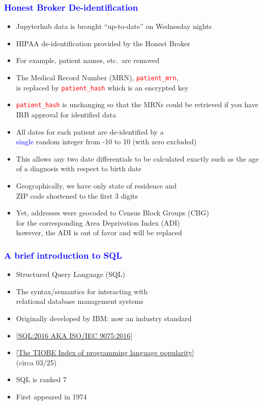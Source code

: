 \documentclass[11pt,pdftex,dvipsnames,usenames]{beamer}
\begin{document}
\begin{frame}[fragile]\frametitle{\bf\textcolor{blue}{Honest Broker De-identification}}

\begin{itemize}
\item Jupyterhub data is brought ``up-to-date'' on Wednesday nights
\item HIPAA de-identification provided by the Honest Broker
\item For example, patient names, etc.\ are removed
\item The Medical Record Number (MRN),
  \textcolor{red}{\texttt{patient\_mrn}},\\ is replaced by 
  \textcolor{red}{\texttt{patient\_hash}} which is an encrypted
  key
\item \textcolor{red}{\texttt{patient\_hash}} is unchanging so that
the MRNs could be retrieved if you have IRB approval for identified
data
\item All dates for each patient are de-identified by a\\
\textcolor{blue}{single} random integer from -10 to 10 (with zero excluded)
\item This allows any two date differentials to be calculated
exactly such as the age of a diagnosis with respect to birth date
\item Geographically, we have only state of residence and\\
ZIP code shortened to the first 3 digits 
\item Yet, addresses were geocoded to Census Block Groups (CBG)\\ 
for the corresponding Area Deprivation Index (ADI)\\
however, the ADI is out of favor and will be replaced
\end{itemize}

\end{frame}


\begin{frame}[fragile]\frametitle{\bf\textcolor{blue}{A brief introduction to SQL}}

\begin{itemize}
\item Structured Query Language (SQL) 
\item The syntax/semantics for interacting with\\
relational database management systems
\item Originally developed by IBM: now an industry standard
\item \textcolor{PineGreen}{[\href{https://www.iso.org/standard/63555.html}
{SQL:2016 AKA ISO/IEC 9075:2016}]}
\item \textcolor{PineGreen}{[\href{https://www.tiobe.com/tiobe-index}
{The TIOBE Index of programming language popularity}]}\\ (circa 03/25)
\item SQL is ranked 7
\item First appeared in 1974
\end{itemize}

\end{frame}
\end{document}
